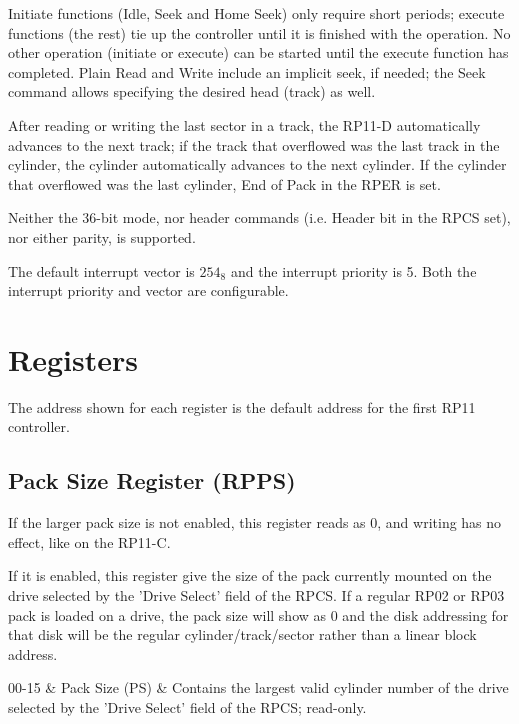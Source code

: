Initiate functions (Idle, Seek and Home Seek) only require short periods;
execute functions (the rest) tie up the controller until it is finished
with the operation. No other operation (initiate or execute) can be
started until the execute function has completed. Plain Read and Write
include an implicit seek, if needed; the Seek command allows specifying
the desired head (track) as well.

After reading or writing the last sector in a track, the RP11-D automatically
advances to the next track; if the track that overflowed was the last track
in the cylinder, the cylinder automatically advances to the next cylinder. If
the cylinder that overflowed was the last cylinder, End of Pack in the RPER
is set.

Neither the 36-bit mode, nor header commands (i.e. Header bit in the RPCS
set), nor either parity, is supported.

The default interrupt vector is $254_8$ and the interrupt priority 
is 5. Both the interrupt priority and vector are configurable.

\section{Registers}

The address shown for each register is the default address for the
first RP11 controller.

\subsection{Pack Size Register (RPPS)}

\bigskip
If the larger pack size is not enabled, this register reads as 0, and writing
has no effect, like on the RP11-C.

If it is enabled, this register give the size of the pack currently mounted
on the drive selected by the 'Drive Select' field of the RPCS.  If a
regular RP02 or RP03 pack is loaded on a drive, the pack size will
show as 0 and the disk addressing for that disk will be the regular
cylinder/track/sector rather than a linear block address.

\begin{register16}
\end{register16}

\begin{bittable}
  00-15 & Pack Size (PS) & Contains the largest valid cylinder number of
  the drive selected by the 'Drive Select' field of the RPCS; read-only. \\
\end{bittable}

